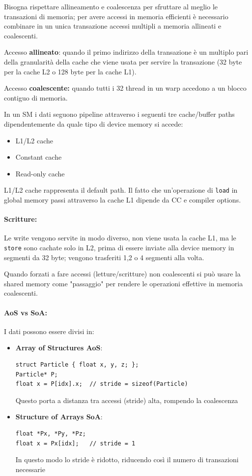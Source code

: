 Bisogna rispettare allineamento e coalescenza per sfruttare al meglio le transazioni di memoria; per avere accessi in memoria efficienti è necessario combinare in un unica transazione accessi multipli a memoria allineati e coalescenti.

Accesso \textbf{allineato}: quando il primo indirizzo della transazione è un multiplo pari della granularità della cache che viene usata per servire la transazione (32 byte per la cache L2 o 128 byte per la cache L1).

Accesso \textbf{coalescente:} quando tutti i 32 thread in un warp accedono a un blocco contiguo di memoria.

In un SM i dati seguono pipeline attraverso i seguenti tre cache/buffer paths dipendentemente da quale tipo di device memory si accede:
\begin{itemize}
	\item L1/L2 cache
    
	\item Constant cache
	
    \item Read-only cache
\end{itemize}

L1/L2 cache rappresenta il default path. Il fatto che un'operazione di \texttt{load} in global memory passi attraverso la cache L1 dipende da CC e compiler options.

\paragraph{Scritture:} Le write vengono servite in modo diverso, non viene usata la cache L1, ma le \texttt{store} sono cachate solo in L2, prima di essere inviate alla device memory in segmenti da 32 byte; vengono trasferiti 1,2 o 4 segmenti alla volta.

Quando forzati a fare accessi (letture/scritture) non coalescenti si può usare la shared memory come "passaggio" per rendere le operazioni effettive in memoria coalescenti.

\paragraph{AoS vs SoA:} I dati possono essere divisi in: 
\begin{itemize}
	\item \textbf{Array of Structures AoS}:
	\begin{verbatim}
struct Particle { float x, y, z; };
Particle* P;
float x = P[idx].x;  // stride = sizeof(Particle)
	\end{verbatim}
	Questo porta a distanza tra accessi (stride) alta, rompendo la coalescenza
	
	\item \textbf{Structure of Arrays SoA}:
	\begin{verbatim}
float *Px, *Py, *Pz;
float x = Px[idx];   // stride = 1
	\end{verbatim}
	In questo modo lo stride è ridotto, riducendo così il numero di transazioni necessarie
\end{itemize}

